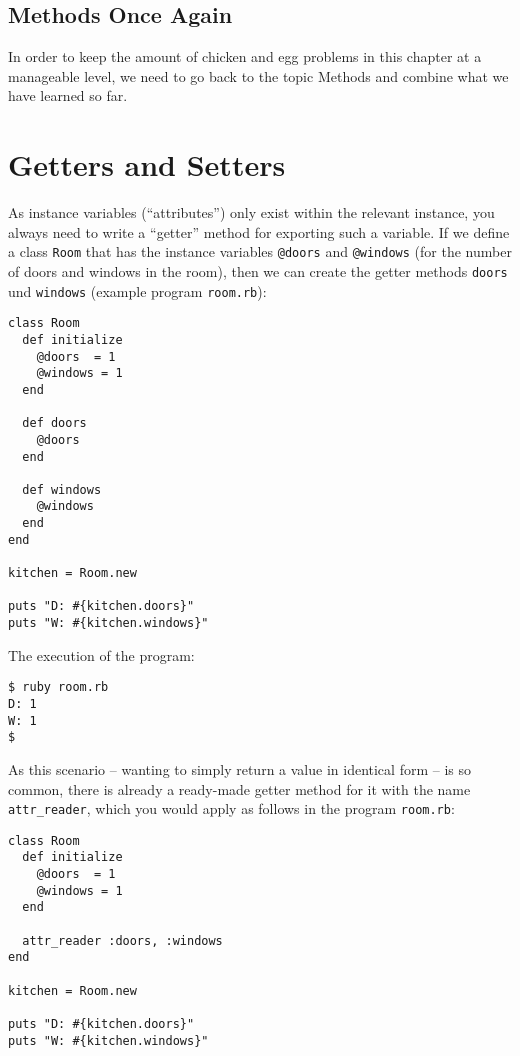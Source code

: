 \documentclass[a4paper]{book}
\newcommand{\chap}[1]{\newpage\thispagestyle{empty}\chapter{#1}\label{chap:\thechapter}}
\begin{document}
\section{Methods Once Again}\label{methods-once-again}

In order to keep the amount of chicken and egg problems in this chapter at a manageable level, we need to go back to the topic Methods and combine what we have learned so far.

\chap{Getters and Setters}\label{getters-and-setters}

As instance variables (“attributes”) only exist within the relevant instance, you always need to write a “getter” method for exporting such a variable. If we define a class \texttt{Room} that has the instance variables \texttt{@doors} and \texttt{@windows} (for the number of doors and windows in the room), then we can create the getter methods \texttt{doors} und \texttt{windows} (example program \texttt{room.rb}):

\begin{shaded}\begin{verbatim}
class Room
  def initialize
    @doors  = 1
    @windows = 1
  end

  def doors
    @doors
  end

  def windows
    @windows
  end
end

kitchen = Room.new

puts "D: #{kitchen.doors}"
puts "W: #{kitchen.windows}"
\end{verbatim}\end{shaded}

The execution of the program:

\begin{shaded}\begin{verbatim}
$ ruby room.rb
D: 1
W: 1
$
\end{verbatim}\end{shaded}

As this scenario -- wanting to simply return a value in identical form -- is so common, there is already a ready-made getter method for it with the name \texttt{attr\_reader}, which you would apply as follows in the program \texttt{room.rb}:

\begin{shaded}\begin{verbatim}
class Room
  def initialize
    @doors  = 1
    @windows = 1
  end

  attr_reader :doors, :windows
end

kitchen = Room.new

puts "D: #{kitchen.doors}"
puts "W: #{kitchen.windows}"
\end{verbatim}\end{shaded}
\end{document}
